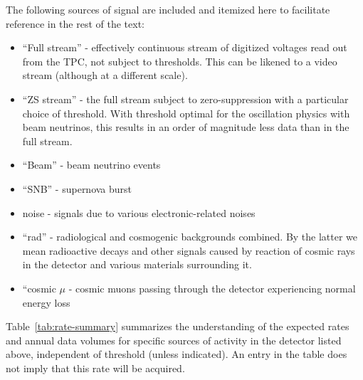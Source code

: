 The following sources of signal are included and itemized here to facilitate reference in
the rest of the text:
\begin{itemize}
	\item ``Full stream'' - effectively continuous stream of digitized voltages read out from the TPC,
	not subject to thresholds. This can be likened to a video stream (although at a different scale).
	\item ``ZS stream'' - the full stream subject to zero-suppression with a particular choice of threshold.
	With threshold optimal for the oscillation physics with beam neutrinos, this results in an order of magnitude less data than in the full stream.
	\item ``Beam'' - beam neutrino events
	\item ``SNB'' - supernova burst
	\item noise - signals due to various electronic-related noises
	\item ``rad'' - radiological and cosmogenic backgrounds combined. By the latter we mean
	radioactive decays and other signals caused by reaction of cosmic rays in the detector and
	various materials surrounding it.
	\item ``cosmic $\mu$ - cosmic muons passing through the detector experiencing normal energy loss
\end{itemize}

Table~\ref{tab:rate-summary} summarizes the understanding of the
expected rates and annual data volumes for specific sources of activity in the detector
listed above, independent of threshold (unless indicated).
An entry in the table does not imply that this rate will be acquired.


